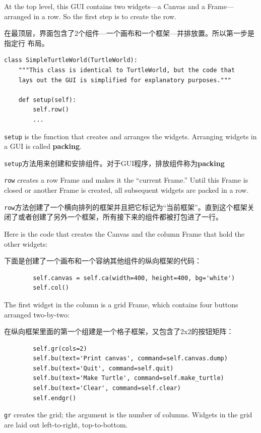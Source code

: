 \documentclass[10pt]{book}
\begin{document}
\begin{CJK}{UTF8}{gbsn}
At the top level, this GUI contains two widgets---a Canvas and a
Frame---arranged in a row.  So the first step is to create the row.

在最顶层，界面包含了2个组件---一个画布和一个框架---并排放置。所以第一步是指定行
布局。

\begin{verbatim}
class SimpleTurtleWorld(TurtleWorld):
    """This class is identical to TurtleWorld, but the code that
    lays out the GUI is simplified for explanatory purposes."""

    def setup(self):
        self.row()
        ...
\end{verbatim}
%
{\tt setup} is the function that creates and arranges the widgets.
Arranging widgets in a GUI is called {\bf packing}.

{\tt setup}方法用来创建和安排组件。对于GUI程序，排放组件称为{\bf packing}

{\tt row} creates a row Frame and makes it the ``current Frame.''
Until this Frame is closed or another Frame is created, all
subsequent widgets are packed in a row.

{\tt row}方法创建了一个横向排列的框架并且把它标记为``当前框架''。直到这个框架关
闭了或者创建了另外一个框架，所有接下来的组件都被打包进了一行。

Here is the code that creates the Canvas and the column Frame
that hold the other widgets:

下面是创建了一个画布和一个容纳其他组件的纵向框架的代码：

\begin{verbatim}
        self.canvas = self.ca(width=400, height=400, bg='white')
        self.col()
\end{verbatim}
%
The first widget in the column is a grid Frame, which contains
four buttons arranged two-by-two:

在纵向框架里面的第一个组建是一个格子框架，又包含了2x2的按钮矩阵：

\begin{verbatim}
        self.gr(cols=2)
        self.bu(text='Print canvas', command=self.canvas.dump)
        self.bu(text='Quit', command=self.quit)
        self.bu(text='Make Turtle', command=self.make_turtle)
        self.bu(text='Clear', command=self.clear)
        self.endgr()
\end{verbatim}
%
{\tt gr} creates the grid; the argument is the number of
columns.  Widgets in the grid are
laid out left-to-right, top-to-bottom.


\end{CJK}
\end{document}
